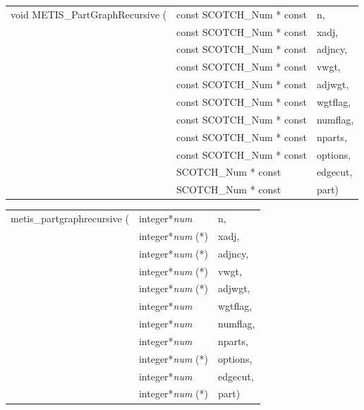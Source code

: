 \begin{itemize}
\progsyn

{\tt\begin{tabular}{l@{}ll}
void METIS\_PartGraphRecursive ( & const SCOTCH\_Num * const & n, \\
                                 & const SCOTCH\_Num * const & xadj, \\
                                 & const SCOTCH\_Num * const & adjncy, \\
                                 & const SCOTCH\_Num * const & vwgt, \\
                                 & const SCOTCH\_Num * const & adjwgt, \\
                                 & const SCOTCH\_Num * const & wgtflag, \\
                                 & const SCOTCH\_Num * const & numflag, \\
                                 & const SCOTCH\_Num * const & nparts, \\
                                 & const SCOTCH\_Num * const & options, \\
                                 & SCOTCH\_Num * const       & edgecut, \\
                                 & SCOTCH\_Num * const       & part)
\end{tabular}}

{\tt\begin{tabular}{l@{}ll}
metis\_partgraphrecursive ( & integer*{\it num}     & n, \\
                            & integer*{\it num} (*) & xadj, \\
                            & integer*{\it num} (*) & adjncy, \\
                            & integer*{\it num} (*) & vwgt, \\
                            & integer*{\it num} (*) & adjwgt, \\
                            & integer*{\it num}     & wgtflag, \\
                            & integer*{\it num}     & numflag, \\
                            & integer*{\it num}     & nparts, \\
                            & integer*{\it num} (*) & options, \\
                            & integer*{\it num}     & edgecut, \\
                            & integer*{\it num} (*) & part)
\end{tabular}}


\end{itemize}
